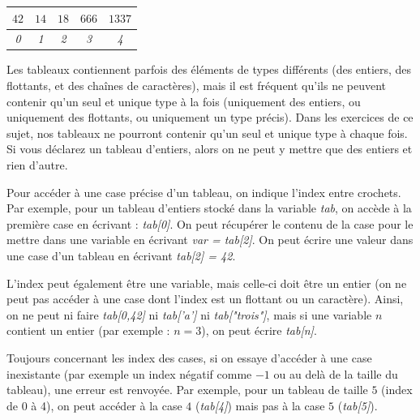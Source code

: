 \documentclass[11pt,a4paper]{article}
\begin{document}
\medskip

\begin{table}[h!]
  \centering
  \begin{tabular}{| c | c | c | c | c |}
  \hline
$ 42 $ & $ 14 $ & $ 18 $ & $ 666 $ & $ 1337 $ \\
  \hline
\textit{0} & \textit{1} & \textit{2} & \textit{3} & \textit{4} \\
  \hline
  \end{tabular}
\end{table}

\medskip

Les tableaux contiennent parfois des éléments de types différents (des entiers, des flottants, et des chaînes de caractères), mais il est fréquent qu'ils ne peuvent contenir qu'un seul et unique type à la fois (uniquement des entiers, ou uniquement des flottants, ou uniquement un type précis).
Dans les exercices de ce sujet, nos tableaux ne pourront contenir qu'un seul et unique type à chaque fois.
Si vous déclarez un tableau d'entiers, alors on ne peut y mettre que des entiers et rien d'autre.

\bigskip

Pour accéder à une case précise d'un tableau, on indique l'index entre crochets.
Par exemple, pour un tableau d'entiers stocké dans la variable \textit{tab}, on accède à la première case en écrivant : \textit{tab[0]}.
On peut récupérer le contenu de la case pour le mettre dans une variable en écrivant \textit{var = tab[2]}.
On peut écrire une valeur dans une case d'un tableau en écrivant \textit{tab[2] = 42}.

\bigskip

L'index peut également être une variable, mais celle-ci doit être un entier (on ne peut pas accéder à une case dont l'index est un flottant ou un caractère).
Ainsi, on ne peut ni faire \textit{tab[0,42]} ni \textit{tab['a']} ni \textit{tab["trois"]}, mais si une variable $ n $ contient un entier (par exemple : $ n = 3 $), on peut écrire \textit{tab[n]}.

\bigskip

Toujours concernant les index des cases, si on essaye d'accéder à une case inexistante (par exemple un index négatif comme $ -1 $ ou au delà de la taille du tableau), une erreur est renvoyée.
Par exemple, pour un tableau de taille $ 5 $ (index de 0 à 4), on peut accéder à la case $ 4 $ (\textit{tab[4]}) mais pas à la case $ 5 $ (\textit{tab[5]}).
\end{document}
